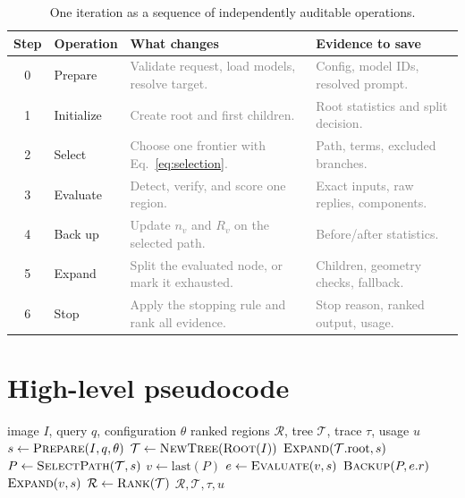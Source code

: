 \documentclass[11pt]{article}
\newcommand{\ph}[1]{\textcolor{gray}{#1}}   %
\newcommand{\proc}[1]{\text{\textsc{#1}}}
\newcommand{\set}[1]{\mathcal{#1}}
\begin{document}
\begin{table}[h]
\centering
\small
\begin{tabularx}{\textwidth}{@{}c l X X@{}}
\toprule
\textbf{Step} & \textbf{Operation} & \textbf{What changes} & \textbf{Evidence to save} \\
\midrule
0 & Prepare & \ph{Validate request, load models, resolve target.} & \ph{Config, model IDs, resolved prompt.} \\
1 & Initialize & \ph{Create root and first children.} & \ph{Root statistics and split decision.} \\
2 & Select & \ph{Choose one frontier with Eq.~\eqref{eq:selection}.} & \ph{Path, terms, excluded branches.} \\
3 & Evaluate & \ph{Detect, verify, and score one region.} & \ph{Exact inputs, raw replies, components.} \\
4 & Back up & \ph{Update $n_v$ and $R_v$ on the selected path.} & \ph{Before/after statistics.} \\
5 & Expand & \ph{Split the evaluated node, or mark it exhausted.} & \ph{Children, geometry checks, fallback.} \\
6 & Stop & \ph{Apply the stopping rule and rank all evidence.} & \ph{Stop reason, ranked output, usage.} \\
\bottomrule
\end{tabularx}
\caption{One iteration as a sequence of independently auditable operations.}
\label{tab:steps}
\end{table}

\section{High-level pseudocode}

\begin{algorithm}[t]
\caption{Bounded recursive search}
\label{alg:search}
\begin{algorithmic}[1]
\Require image $I$, query $q$, configuration $\theta$
\Ensure ranked regions $\set{R}$, tree $\set{T}$, trace $\tau$, usage $u$
\State $s \gets \proc{Prepare}(I,q,\theta)$
\State $\set{T} \gets \proc{NewTree}(\proc{Root}(I))$
\State $\proc{Expand}(\set{T}.\text{root}, s)$
\While{not $\proc{Stop}(\set{T},s)$}
  \State $P \gets \proc{SelectPath}(\set{T},s)$
  \State $v \gets \text{last}(P)$
  \State $e \gets \proc{Evaluate}(v,s)$
  \State $\proc{Backup}(P,e.r)$
  \State $\proc{Expand}(v,s)$
\EndWhile
\State $\set{R} \gets \proc{Rank}(\set{T})$
\State \Return $\set{R}, \set{T}, \tau, u$
\end{algorithmic}
\end{algorithm}
\end{document}
